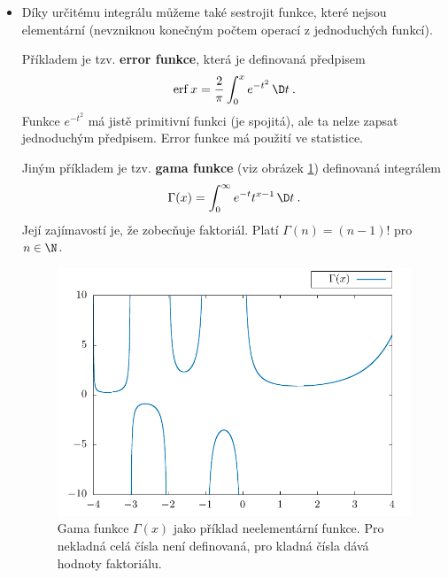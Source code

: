 \begin{itemize}
    \item Díky určitému integrálu můžeme také sestrojit funkce, které nejsou elementární (nevzniknou konečným počtem operací z jednoduchých funkcí).
    
    Příkladem je tzv. \textbf{error funkce}, která je definovaná předpisem \begin{align}
        \mathrm{erf}\,x = \frac{2}{\pi} \int_0^x e^{-t^2}\, \D t \:.
    \end{align}
    Funkce $e^{-t^2}$ má jistě primitivní funkci (je spojitá), ale ta nelze zapsat jednoduchým předpisem. Error funkce má použití ve statistice.

    Jiným příkladem je tzv. \textbf{gama funkce} (viz obrázek \ref{fig:gammafce}) definovaná integrálem
    \begin{align}
        \Gamma (x) = \int_0^{\infty} e^{-t} t^{x-1} \, \D t \:.
    \end{align}
    Její zajímavostí je, že zobecňuje faktoriál. Platí $\Gamma(n) = (n-1)!$ pro $n \in \N$.

    \begin{figure}[h]
        \centering
        \includegraphics[scale = 0.8]{Gnuplot/Figures/gammafce-obr.pdf}
        \caption{Gama funkce $\Gamma(x)$ jako příklad neelementární funkce. Pro nekladná celá čísla není definovaná, pro kladná čísla dává hodnoty faktoriálu.}
        \label{fig:gammafce}
    \end{figure}
\end{itemize}


